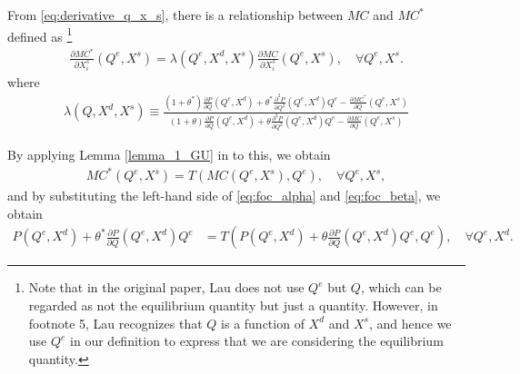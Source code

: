 \documentclass[11pt, a4paper]{article}
\theoremstyle{remark}
\begin{document}
From \eqref{eq:derivative_q_x_s}, there is a relationship between $MC$ and $MC^{*}$ defined as
\footnote{
    Note that in the original paper, Lau does not use $Q^e$ but $Q$, which can be regarded as not the equilibrium quantity but just a quantity.
    However, in footnote 5, Lau recognizes that $Q$ is a function of $X^{d}$ and $X^{s}$, and hence we use $Q^e$ in our definition to express that we are considering the equilibrium quantity.
}
\begin{align}
    \frac{\partial MC^{*}}{\partial X^{s}_{i}}(Q^e, X^{s}) = \lambda(Q^e, X^{d},  X^{s})\frac{\partial MC}{\partial X^{s}_{i}}(Q^e, X^{s}), \quad \forall Q^e, X^{s}. \label{eq:derivative_q_x_s_la}
\end{align}
where
\begin{align}
    \lambda(Q, X^{d}, X^{s}) \equiv \frac{(1+\theta^{*})\frac{\partial P}{\partial Q}(Q^e, X^{d}) + \theta^{*}\frac{\partial^2 P}{\partial Q^2}(Q^e, X^{d})Q^e - \frac{\partial MC^{*}}{\partial Q}(Q^e, X^{s})}{(1+\theta)\frac{\partial P}{\partial Q}(Q^e, X^{d}) + \theta\frac{\partial^2 P}{\partial Q^2}(Q^e, X^{d})Q^e - \frac{\partial MC}{\partial Q}(Q^e, X^{s})}
\end{align}


By applying Lemma \ref{lemma_1_GU} in \citet{goldmanNote1964} to this, we obtain
\begin{align}
    MC^{*}(Q^e, X^{s}) = T\left(MC(Q^e, X^{s}), Q^e\right), \quad \forall Q^e, X^{s}, \label{eq:transformation_T_mc_la}
\end{align}
and by substituting the left-hand side of \eqref{eq:foc_alpha} and \eqref{eq:foc_beta}, we obtain 
\begin{align}
    P(Q^e, X^{d}) + \theta^{*} \frac{\partial P}{\partial Q}(Q^e, X^{d}) Q^e & = T\left(P(Q^e, X^{d}) + \theta \frac{\partial P}{\partial Q}(Q^e, X^{d}) Q^e, Q^e\right), \quad \forall Q^e, X^{d}.\label{eq:transformation_T_demand_la}
\end{align}
\end{document}
